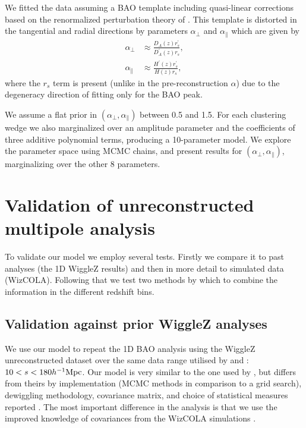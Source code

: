 \documentclass[a4paper,fleqn,usenatbib]{mnras}
\begin{document}
We fitted the data assuming a BAO template including
quasi-linear corrections based on the renormalized perturbation theory
of \citet{CrocceScoccimarro2008}. This template is distorted in the tangential
and radial directions by parameters $\alpha_\perp$ and
$\alpha_\parallel$ which are given by
\begin{align}
\alpha_\perp &\approx \frac{D_A(z) r^\prime_s }{D_A^{\prime}(z) r_s}, \label{eq:alphaperp}\\
\alpha_\parallel &\approx \frac{H^{\prime}(z) r^\prime_s}{H(z) r_s},\label{eq:alphaparallel}
\end{align}
where the $r_s$ term is present (unlike in the pre-reconstruction $\alpha$) due to the degeneracy direction of fitting only for the BAO peak.

  


We assume a flat prior in $(\alpha_\perp,\alpha_\parallel)$ between
0.5 and 1.5.  For each clustering wedge we also marginalized over an
amplitude parameter and the coefficients of three additive polynomial
terms, producing a 10-parameter model.  We explore the parameter space
using MCMC chains, and present results for
$(\alpha_\perp,\alpha_\parallel)$, marginalizing over the other 8
parameters.


\section{Validation of unreconstructed multipole analysis}
\label{sec:test}

To validate our model we employ several tests.  Firstly we compare it to past analyses (the 1D WiggleZ results) and then in more detail to simulated data (WizCOLA).  Following that we test two methods by which to combine the information in the different redshift bins.







\subsection{Validation against prior WiggleZ analyses}


We use our model to repeat the 1D BAO analysis using the WiggleZ unreconstructed dataset over the same data range utilised by \citet{BlakeDavis2011} and \citet{BlakeKazin2011}: $10<s<180 h^{-1}\rm{Mpc}$. Our model is very similar to the one used by \citet{BlakeKazin2011}, but differs from theirs by implementation (MCMC methods in comparison to a grid search), dewiggling methodology, covariance matrix, and choice of statistical measures reported \citep[we use maximum likelihood statistics, as opposed to mean statistics used in][]{BlakeDavis2011}. The most important difference in the analysis is that we use the improved knowledge of covariances from the WizCOLA simulations \citep[as compared to the lognormal realisations used in][]{BlakeKazin2011}.
\end{document}
